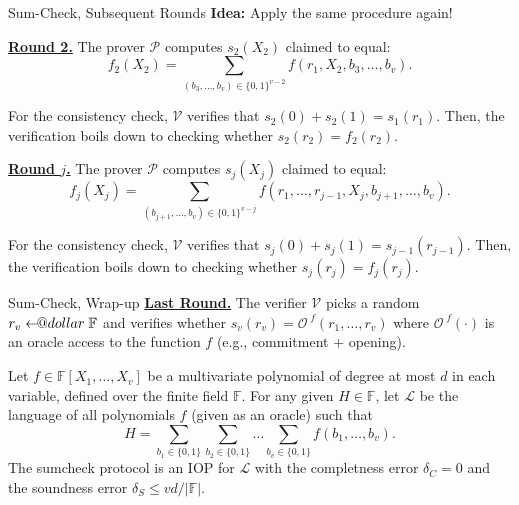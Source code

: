 \documentclass{zkdl-presentation-template}
\makeatletter
\newcommand\leftarrowS{\leftarrow\joinrel\smalldollar}
\newcommand{\smalldollar}{\mathrel{\mathpalette\small@dollar\relax}}
\newcommand{\small@dollar}[2]{%
  \vcenter{\hbox{%
    $#1\textnormal{\fontsize{0.7\dimexpr\f@size pt}{0}\selectfont\$}$%
  }}%
}
\makeatother
\begin{document}
    \begin{frame}{Sum-Check, Subsequent Rounds}
        \textbf{Idea:} Apply the same procedure again!

        \underline{\textbf{Round 2.}} The prover $\mathcal{P}$ computes
        $s_2(X_2)$ claimed to equal:
        \begin{equation*}
            f_2(X_2) = \sum_{(b_3,\dots,b_v) \in \{0,1\}^{v-2}}f(r_1,X_2,b_3,\dots,b_v).
        \end{equation*}

        For the consistency check, $\mathcal{V}$ verifies that $s_2(0) + s_2(1)
        = s_1(r_1)$. Then, the verification boils down to checking whether
        $s_2(r_2) = f_2(r_2)$.

        \underline{\textbf{Round $j$.}} The prover $\mathcal{P}$ computes
        $s_j(X_j)$ claimed to equal:
        \begin{equation*}
            f_j(X_j) = \sum_{(b_{j+1},\dots,b_v) \in \{0,1\}^{v-j}}f(r_1,\dots,r_{j-1},X_j,b_{j+1},\dots,b_v).
        \end{equation*}

        For the consistency check, $\mathcal{V}$ verifies that $s_j(0) + s_j(1)
        = s_{j-1}(r_{j-1})$. Then, the verification boils down to checking whether
        $s_j(r_j) = f_j(r_j)$.
    \end{frame}

    \begin{frame}{Sum-Check, Wrap-up}
        \underline{\textbf{Last Round.}} The verifier $\mathcal{V}$ picks a
        random $r_v \leftarrowS \mathbb{F}$ and verifies whether $s_v(r_v) =
        \mathcal{O}^{\; f}(r_1,\dots,r_v)$ where $\mathcal{O}^{\; f}(\cdot)$ is
        an oracle access to the function $f$ (e.g., commitment + opening).

        \begin{lemma}
            Let $f \in \mathbb{F}[X_1,\dots,X_v]$ be a multivariate polynomial of degree
    at most $d$ in each variable, defined over the finite field $\mathbb{F}$.
    For any given $H \in \mathbb{F}$, let $\mathcal{L}$ be the language of 
    all polynomials $f$ (given as an oracle) such that
    \begin{equation*}
        H = \sum_{b_1 \in \{0,1\}}\sum_{b_2 \in \{0,1\}} \dots \sum_{b_v \in \{0,1\}} f(b_1,\dots,b_v).
    \end{equation*}
    The sumcheck protocol is an IOP for $\mathcal{L}$ with the completness error
    $\delta_C=0$ and the soundness error $\delta_S \leq vd/|\mathbb{F}|$.
        \end{lemma}
    \end{frame}
\end{document}
